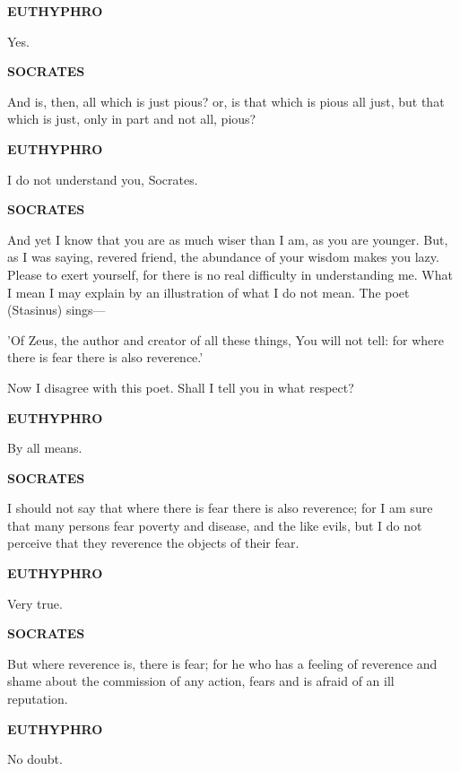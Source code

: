 \documentclass[11pt,letter]{article}
\begin{document}
\par \textbf{EUTHYPHRO}
\par   Yes.

\par \textbf{SOCRATES}
\par   And is, then, all which is just pious? or, is that which is pious all just, but that which is just, only in part and not all, pious?

\par \textbf{EUTHYPHRO}
\par   I do not understand you, Socrates.

\par \textbf{SOCRATES}
\par   And yet I know that you are as much wiser than I am, as you are younger. But, as I was saying, revered friend, the abundance of your wisdom makes you lazy. Please to exert yourself, for there is no real difficulty in understanding me. What I mean I may explain by an illustration of what I do not mean. The poet (Stasinus) sings—

\par  'Of Zeus, the author and creator of all these things, You will not tell: for where there is fear there is also reverence.'

\par  Now I disagree with this poet. Shall I tell you in what respect?

\par \textbf{EUTHYPHRO}
\par   By all means.

\par \textbf{SOCRATES}
\par   I should not say that where there is fear there is also reverence; for I am sure that many persons fear poverty and disease, and the like evils, but I do not perceive that they reverence the objects of their fear.

\par \textbf{EUTHYPHRO}
\par   Very true.

\par \textbf{SOCRATES}
\par   But where reverence is, there is fear; for he who has a feeling of reverence and shame about the commission of any action, fears and is afraid of an ill reputation.

\par \textbf{EUTHYPHRO}
\par   No doubt.
\end{document}
